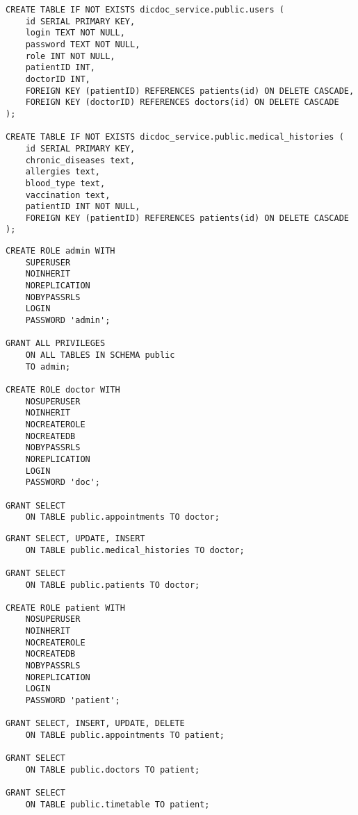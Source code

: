 \clearpage
\setcounter{lstlisting}{1}
\begin{lstlisting}[label=lst:init,caption=\raggedright{Создание таблиц (конец)}]
CREATE TABLE IF NOT EXISTS dicdoc_service.public.users (
	id SERIAL PRIMARY KEY,
	login TEXT NOT NULL,
	password TEXT NOT NULL,
	role INT NOT NULL,
	patientID INT,
	doctorID INT,
	FOREIGN KEY (patientID) REFERENCES patients(id) ON DELETE CASCADE,
	FOREIGN KEY (doctorID) REFERENCES doctors(id) ON DELETE CASCADE
);
	
CREATE TABLE IF NOT EXISTS dicdoc_service.public.medical_histories (
	id SERIAL PRIMARY KEY,
	chronic_diseases text,
	allergies text,
	blood_type text,
	vaccination text,
	patientID INT NOT NULL,
	FOREIGN KEY (patientID) REFERENCES patients(id) ON DELETE CASCADE
);
\end{lstlisting}


\begin{lstlisting}[label=lst:roles,caption=\raggedright{Создание ролей (начало)}]
CREATE ROLE admin WITH
	SUPERUSER
	NOINHERIT
	NOREPLICATION
	NOBYPASSRLS
	LOGIN
	PASSWORD 'admin';

GRANT ALL PRIVILEGES
	ON ALL TABLES IN SCHEMA public
	TO admin;	

CREATE ROLE doctor WITH
	NOSUPERUSER
	NOINHERIT
	NOCREATEROLE
	NOCREATEDB
	NOBYPASSRLS
	NOREPLICATION
	LOGIN
	PASSWORD 'doc';

GRANT SELECT
	ON TABLE public.appointments TO doctor;

\end{lstlisting}

\clearpage
\setcounter{lstlisting}{2}
\begin{lstlisting}[label=lst:roles,caption=\raggedright{Создание ролей (конец)}]
GRANT SELECT, UPDATE, INSERT
	ON TABLE public.medical_histories TO doctor;
	
GRANT SELECT
	ON TABLE public.patients TO doctor;
	
CREATE ROLE patient WITH
	NOSUPERUSER
	NOINHERIT
	NOCREATEROLE
	NOCREATEDB
	NOBYPASSRLS
	NOREPLICATION
	LOGIN
	PASSWORD 'patient';
	
GRANT SELECT, INSERT, UPDATE, DELETE
	ON TABLE public.appointments TO patient;
	
GRANT SELECT
	ON TABLE public.doctors TO patient;
	
GRANT SELECT
	ON TABLE public.timetable TO patient;
	
\end{lstlisting}

\clearpage


